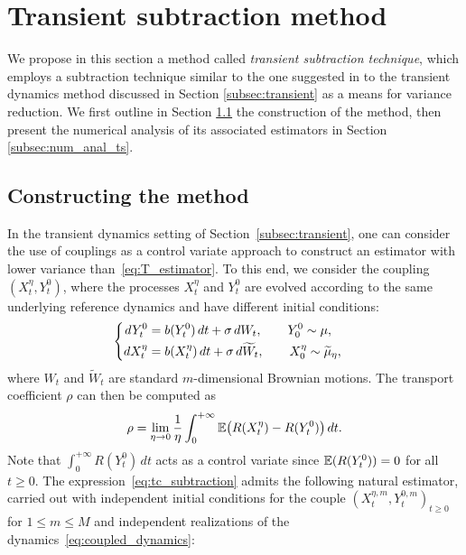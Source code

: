 \section{Transient subtraction method}
\label{sec:transient}
%
We propose in this section a method called \emph{transient subtraction technique}, which employs a subtraction technique similar to the one suggested in \cite{ciccotti75} to the transient dynamics method discussed in Section \ref{subsec:transient} as a means for variance reduction. We first outline in Section \ref{subsec:constructing_method} the construction of the method, then present the numerical analysis of its associated estimators in Section \ref{subsec:num_anal_ts}.

\subsection{Constructing the method}
\label{subsec:constructing_method}
%
In the transient dynamics setting of Section~\ref{subsec:transient}, one can consider the use of couplings as a control variate approach to construct an estimator with lower variance than~\eqref{eq:T_estimator}. To this end, we consider the coupling $(X_t^\eta,Y_t^0)$, where the processes $X_t^\eta$ and $Y_t^0$ are evolved according to the same underlying reference dynamics and have different initial conditions:
%
\begin{equation}
\begin{cases}
\begin{aligned}
	dY_t^0 &= b(Y_t^0) \, dt + \sigma \, dW_t, \qquad Y_0^0 \sim \mu, \\
	dX_t^\eta &= b(X_t^\eta) \, dt + \sigma \, d\widetilde{W}_t, \qquad X_0^\eta \sim \widetilde{\mu}_\eta,
\end{aligned}
\end{cases}
\label{eq:coupled_dynamics}
\end{equation}
%
where $W_t$ and $\widetilde{W}_t$ are standard $m$-dimensional Brownian motions. The transport coefficient $\rho$ can then be computed as
%
\begin{equation}
	\rho = \lim_{\eta\to 0} \frac{1}{\eta}\int_0^{+\infty} \E\paren*{R(X_t^\eta) - R(Y_t^0)}\,  dt.
	\label{eq:tc_subtraction}
\end{equation}
%
Note that $\int_0^{+\infty} R(Y_t^0) \, dt$ acts as a control variate since $\mathbb{E}(R(Y_t^0))=0$ for all $t\geq 0$. The expression~\eqref{eq:tc_subtraction} admits the following natural estimator, carried out with independent initial conditions for the couple $(X_t^{\eta,m},Y_t^{0,m})_{t\geq 0}$ for $1\leq m\leq M$ and independent realizations of the dynamics~\eqref{eq:coupled_dynamics}:
